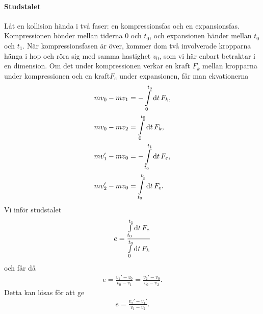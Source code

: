 \paragraph{Studstalet}
Låt en kollision hända i två faser: en kompressionsfas och en expansionsfas. Kompressionen hönder mellan tiderna $0$ och $t_0$, och expansionen händer mellan $t_0$ och $t_1$. När kompressionsfasen är över, kommer dom två involverade kropparna hänga i hop och röra sig med samma hastighet $v_0$, som vi här enbart betraktar i en dimension. Om det under kompressionen verkar en kraft $F_{k}$ mellan kropparna under kompressionen och en kraft$F_{e}$ under expansionen, får man ekvationerna
\begin{align*}
	mv_0 - mv_1  &= -\int\limits_{0}^{t_0}\dd{t}F_{k}, \\
	mv_0 - mv_2  &= \int\limits_{0}^{t_0}\dd{t}F_{k}, \\
	mv_1' - mv_0 &= -\int\limits_{t_0}^{t_1}\dd{t}F_{e}, \\
	mv_2' - mv_0 &= \int\limits_{t_0}^{t_1}\dd{t}F_{e}.
\end{align*}
Vi inför studstalet
\begin{align*}
	e = \frac{\int\limits_{t_0}^{t_1}\dd{t}F_{e}}{\int\limits_{0}^{t_0}\dd{t}F_{k}}
\end{align*}
och får då
\begin{align*}
	e = \frac{v_1' - v_0}{v_0 - v_1} = \frac{v_2' - v_0}{v_0 - v_2}.
\end{align*}
Detta kan lösas för att ge
\begin{align*}
	e = \frac{v_2' - v_1'}{v_1 - v_2}.
\end{align*}